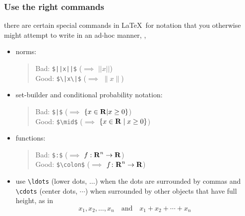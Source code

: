 \documentclass[usepdftitle=false]{beamer}
\begin{document}
\begin{frame}[fragile]
    \frametitle{Use the right commands}

    there are certain special commands in \LaTeX\ for notation that you otherwise might attempt to write in an ad-hoc manner, \eg,
    \begin{itemize}\itemsep=12pt
        \item norms: 
            \begin{quote}
                Bad: \verb+$||x||$+ ($\implies$ $||x||$)\\
                Good: \verb+$\|x\|$+ ($\implies$ $\|x\|$)
            \end{quote}
        \item set-builder and conditional probability notation:
            \begin{quote}
                Bad: \verb+$|$+ ($\implies$ $\{x \in {\bf R{}} | x \geq 0 \}$)\\
                Good: \verb+$\mid$+ ($\implies$ $\{ x \in {\bf R{}} \mid x \geq 0 \}$)
            \end{quote}
        \item functions:
            \begin{quote}
                Bad: \verb+$:$+ ($\implies$ $f: {\bf R{}}^n \to {\bf R{}}$)\\
                Good: \verb+$\colon$+ ($\implies$ $f \colon {\bf R{}}^n \to {\bf R{}}$)
            \end{quote}
        \item use \verb+\ldots+ (lower dots, $\ldots$) when the dots are surrounded by commas and \verb+\cdots+ (center dots, $\cdots$) when surrounded by other objects that have full height, as in
        \[
            x_1, x_2, \ldots, x_n\quad \mbox{and}\quad x_1 + x_2 + \cdots + x_n
        \]
    \end{itemize}
\end{frame}
\end{document}
